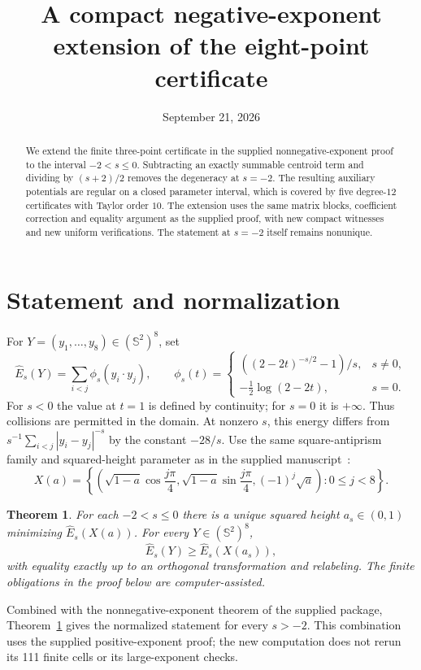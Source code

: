 \documentclass[11pt,reqno]{amsart}
\title[Eight points: negative exponents]{A compact negative-exponent extension of the eight-point certificate}
\author{}
\date{September 21, 2026}
\newtheorem{theorem}{Theorem}[section]
\theoremstyle{remark}\newtheorem{remark}[theorem]{Remark}
\newcommand{\Sph}{\mathbb S^2}
\newcommand{\Eh}{\widehat E}
\numberwithin{equation}{section}
\begin{document}
\begin{abstract}
We extend the finite three-point certificate in the supplied nonnegative-exponent
proof to the interval $-2<s\le0$. Subtracting an exactly summable centroid term
and dividing by $(s+2)/2$ removes the degeneracy at $s=-2$. The resulting
auxiliary potentials are regular on a closed parameter interval, which is
covered by five degree-$12$ certificates with Taylor order $10$. The extension
uses the same matrix blocks, coefficient correction and equality argument as
the supplied proof, with new compact witnesses and new uniform verifications.
The statement at $s=-2$ itself remains nonunique.
\end{abstract}
\maketitle

\section{Statement and normalization}
For $Y=(y_1,\ldots,y_8)\in(\Sph)^8$, set
\[
 \Eh_s(Y)=\sum_{i<j}\phi_s(y_i\cdot y_j),\qquad
 \phi_s(t)=\begin{cases}
 ((2-2t)^{-s/2}-1)/s,&s\ne0,\\
 -\tfrac12\log(2-2t),&s=0.
 \end{cases}
\]
For $s<0$ the value at $t=1$ is defined by continuity; for $s=0$ it is
$+\infty$. Thus collisions are permitted in the domain. At nonzero $s$, this
energy differs from $s^{-1}\sum_{i<j}|y_i-y_j|^{-s}$ by the constant $-28/s$.
Use the same square-antiprism family and squared-height parameter as in the
supplied manuscript~\cite{source}:
\begin{equation}\label{eq:X}
 X(a)=\left\{\left(\sqrt{1-a}\cos\frac{j\pi}{4},
 \sqrt{1-a}\sin\frac{j\pi}{4},(-1)^j\sqrt a\right):0\le j<8\right\}.
\end{equation}

\begin{theorem}\label{thm:negative}
For each $-2<s\le0$ there is a unique squared height $a_s\in(0,1)$ minimizing
$\Eh_s(X(a))$. For every $Y\in(\Sph)^8$,
\[
 \Eh_s(Y)\ge\Eh_s(X(a_s)),
\]
with equality exactly up to an orthogonal transformation and relabeling.
The finite obligations in the proof below are computer-assisted.
\end{theorem}

Combined with the nonnegative-exponent theorem of the supplied package,
Theorem~\ref{thm:negative} gives the normalized statement for every $s>-2$.
This combination uses the supplied positive-exponent proof; the new computation
does not rerun its 111 finite cells or its large-exponent checks.
\end{document}
